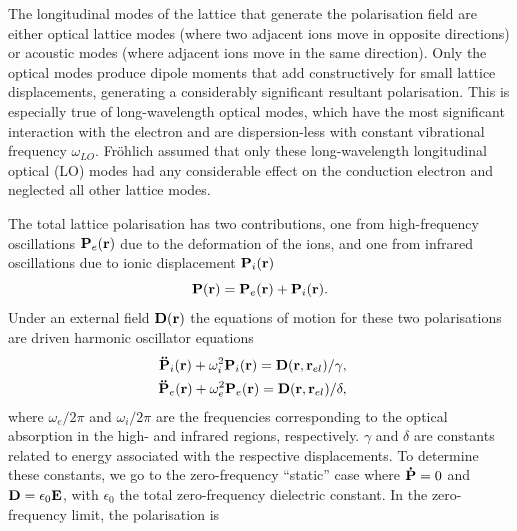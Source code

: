The longitudinal modes of the lattice that generate the polarisation field are either optical lattice modes (where two adjacent ions move in opposite directions) or acoustic modes (where adjacent ions move in the same direction). Only the optical modes produce dipole moments that add constructively for small lattice displacements, generating a considerably significant resultant polarisation. This is especially true of long-wavelength optical modes, which have the most significant interaction with the electron and are dispersion-less with constant vibrational frequency $\omega_{LO}$. Fr\"ohlich assumed that only these long-wavelength longitudinal optical (LO) modes had any considerable effect on the conduction electron and neglected all other lattice modes. 

The total lattice polarisation has two contributions, one from high-frequency oscillations $\vb{P}_{e}(\vb{r})$ due to the deformation of the ions, and one from infrared oscillations due to ionic displacement $\vb{P}_{i}(\vb{r})$
\begin{equation}
    \vb{P}(\vb{r}) = \vb{P}_{e}(\vb{r}) + \vb{P}_{i}(\vb{r}).
\label{eqn-2121-7}
\end{equation}
Under an external field $\vb{D}(\vb{r})$ the equations of motion for these two polarisations are driven harmonic oscillator equations
\begin{subequations}
\begin{align}
    \begin{split}
        \vb{\ddot{P}}_{i}(\vb{r}) + \omega^2_{i} \vb{P}_{i}(\vb{r}) &= \vb{D}(\vb{r}, \vb{r}_{el}) / \gamma,
    \end{split}\\
    \begin{split}
        \vb{\ddot{P}}_{e}(\vb{r}) + \omega^2_{e} \vb{P}_{e}(\vb{r}) &= \vb{D}(\vb{r}, \vb{r}_{el}) / \delta,
    \end{split}
\end{align}
\label{eqn-2121-8}
\end{subequations}
where $\omega_{e}/2\pi$ and $\omega_{i}/2\pi$ are the frequencies corresponding to the optical absorption in the high- and infrared regions, respectively. $\gamma$ and $\delta$ are constants related to energy associated with the respective displacements. To determine these constants, we go to the zero-frequency ``static'' case where $\vb{\dot{P}} = 0$ and $\vb{D} = \epsilon_0 \vb{E}$, with $\epsilon_0$ the total zero-frequency dielectric constant. In the zero-frequency limit, the polarisation is
